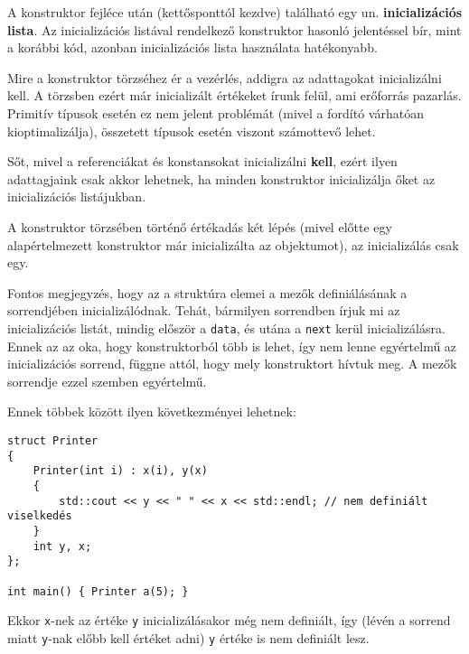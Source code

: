 \documentclass[../cpp_book/cpp_book.tex]{subfiles}
\begin{document}
	\medskip
	A konstruktor fejléce után (kettősponttól kezdve) található egy un. \textbf{inicializációs lista}. Az inicializációs listával rendelkező konstruktor hasonló jelentéssel bír, mint a korábbi kód, azonban inicializációs lista használata hatékonyabb.
	
	Mire a konstruktor törzséhez ér a vezérlés, addigra az adattagokat inicializálni kell. A törzsben ezért már inicializált értékeket írunk felül, ami erőforrás pazarlás. Primitív típusok esetén ez nem jelent problémát (mivel a fordító várhatóan kioptimalizálja), összetett típusok esetén viszont számottevő lehet.
	
	Sőt, mivel a referenciákat és konstansokat inicializálni \textbf{kell}, ezért ilyen adattagjaink csak akkor lehetnek, ha minden konstruktor inicializálja őket az inicializációs listájukban.
	\begin{note}
	    A konstruktor törzsében történő értékadás két lépés (mivel előtte egy alapértelmezett konstruktor már inicializálta az objektumot), az inicializálás csak egy.
	\end{note}
	Fontos megjegyzés, hogy az a struktúra elemei a mezők definiálásának a sorrendjében inicializálódnak. Tehát, bármilyen sorrendben írjuk mi az inicializációs listát, mindig először a \texttt{data}, és utána a \texttt{next} kerül inicializálásra. Ennek az az oka, hogy konstruktorból több is lehet, így nem lenne egyértelmű az inicializációs sorrend, függne attól, hogy mely konstruktort hívtuk meg. A mezők sorrendje ezzel szemben egyértelmű.
	
	Ennek többek között ilyen következményei lehetnek:
	\begin{lstlisting}
struct Printer
{
	Printer(int i) : x(i), y(x) 
	{
		std::cout << y << " " << x << std::endl; // nem definiált viselkedés
	}
	int y, x;
};

int main() { Printer a(5); }
	\end{lstlisting}
	Ekkor \texttt{x}-nek az értéke \texttt{y} inicializálásakor még nem definiált, így (lévén a sorrend miatt \texttt{y}-nak előbb kell értéket adni) \texttt{y} értéke is nem definiált lesz.
	
\end{document}
